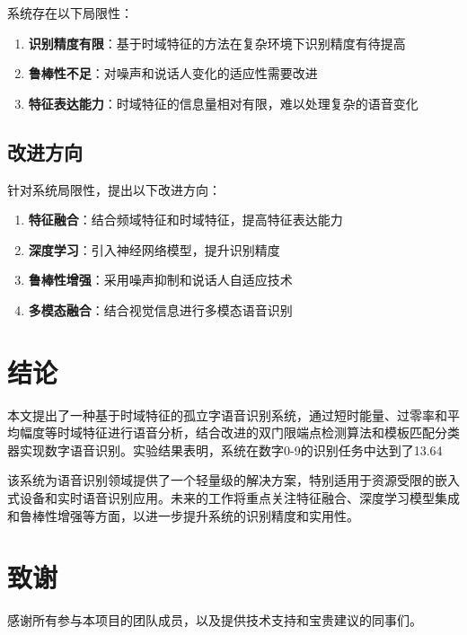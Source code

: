 \documentclass[sigconf,nonacm]{acmart}
\begin{document}
系统存在以下局限性：

\begin{enumerate}
\item \textbf{识别精度有限}：基于时域特征的方法在复杂环境下识别精度有待提高
\item \textbf{鲁棒性不足}：对噪声和说话人变化的适应性需要改进
\item \textbf{特征表达能力}：时域特征的信息量相对有限，难以处理复杂的语音变化
\end{enumerate}

\subsection{改进方向}

针对系统局限性，提出以下改进方向：

\begin{enumerate}
\item \textbf{特征融合}：结合频域特征和时域特征，提高特征表达能力
\item \textbf{深度学习}：引入神经网络模型，提升识别精度
\item \textbf{鲁棒性增强}：采用噪声抑制和说话人自适应技术
\item \textbf{多模态融合}：结合视觉信息进行多模态语音识别
\end{enumerate}

\section{结论}

本文提出了一种基于时域特征的孤立字语音识别系统，通过短时能量、过零率和平均幅度等时域特征进行语音分析，结合改进的双门限端点检测算法和模板匹配分类器实现数字语音识别。实验结果表明，系统在数字0-9的识别任务中达到了13.64%

该系统为语音识别领域提供了一个轻量级的解决方案，特别适用于资源受限的嵌入式设备和实时语音识别应用。未来的工作将重点关注特征融合、深度学习模型集成和鲁棒性增强等方面，以进一步提升系统的识别精度和实用性。

\section*{致谢}

感谢所有参与本项目的团队成员，以及提供技术支持和宝贵建议的同事们。
\end{document}
